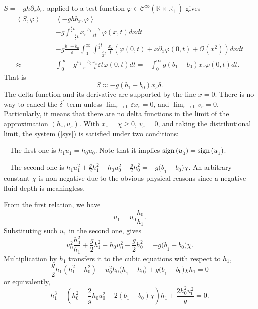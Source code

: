\documentclass{article}
\theoremstyle{plain}
\theoremstyle{definition}
\theoremstyle{remark}
\begin{document}
$S=-gh\partial_{x}b_{\varepsilon}$, applied to a test function 
$\varphi\in \mathcal{C}^{\infty}(\mathbb{R}\times \mathbb{R}_{+})$ gives
\[ 
\begin{split} \left\langle S,\varphi \right\rangle = & \left\langle - ghb_{x},
\varphi \right\rangle  \\ 
= & - g \int_{-\frac{\varepsilon}{2}t}^{\frac{\varepsilon}{2}t}
{x_{\varepsilon}\frac{b_{1} - b_{0}}{\varepsilon t}}\varphi(x,t)dxdt  \\ 
= & - g\frac{b_{1} - b_{0}}{\varepsilon}
\int_{0}^{\infty} \int_{- \frac{\varepsilon}{2}t}^{\frac{\varepsilon}{2}t}
\frac{x_{\varepsilon}}{t} 
\left( \varphi(0,t) + x\partial_{x}\varphi(0,t) 
+ \mathcal{O}\left( x^{2} \right) \right)dx dt  \\ 
\approx & \int_{0}^{\infty}{- g\frac{b_{1} - b_{0}}{\varepsilon}
\frac{x_{\varepsilon}}{t}}\varepsilon t\varphi(0,t)dt
= - \int_{0}^{\infty}g(b_{1} - b_{0})x_{\varepsilon}\varphi(0,t)dt. 
\end{split} \]
That is
\[S \approx - g\left( b_{1} - b_{0} \right)x_{\varepsilon}\delta.\]
The delta function and its 
derivative are supported by the line \(x = 0\).
There is no way to cancel  the \(\delta^{'}\) term 
unless \( \lim_{\varepsilon \to 0} \varepsilon {x_{\varepsilon} 
= 0}\), and  
\( \lim_{\varepsilon \to 0} v_{\varepsilon} = 0.\)
Particularly, it means that there are no delta functions in the
limit of the approximation $(h_{\varepsilon},u_{\varepsilon})$. 
With \(x_{\varepsilon} = \chi \geq 0\), $v_{\varepsilon}=0$,
and taking the distributional limit, the system (\ref{sys}) 
is satisfied under two conditions:

\noindent
-- The first one is \(h_{1}u_{1} = h_{0}u_{0}\). Note that it implies 
\( \mathop{\rm sign}{(u}_{0}) 
= \mathop{\rm sign}{(u}_{1})\).

\noindent
-- The second one is 
\(h_{1}u_{1}^{2} + \frac{g}{2}h_{1}^{2} - h_{0}u_{0}^{2} - \frac{g}{2}h_{0}^{2} 
= - g{(b}_{1} - b_{0})\chi.\)
An arbitrary constant \(\chi \) is non-negative due 
to the obvious physical reasons since a negative fluid depth is meaningless.

From the first relation, we have
\begin{equation} \label{u1}
u_{1} = u_{0}\dfrac{h_{0}}{h_{1}}.
\end{equation}
Substituting such \(u_{1}\) in the second one, gives
\[u_{0}^{2}\frac{h_{0}^{2}}{h_{1}} + \frac{g}{2}h_{1}^{2} - h_{0}u_{0}^{2} - \frac{g}{2}h_{0}^{2} = - g{(b}_{1} - b_{0})\chi. \]
Multiplication by \(h_{1}\) transfers it to the cubic equations
with respect to $h_{1}$, 
\[\frac{g}{2}h_{1}\left( h_{1}^{2} - h_{0}^{2} \right) 
- u_{0}^{2}{h_{0}(h}_{1} - h_{0}) + g{(b}_{1} - b_{0})\chi h_{1} = 0\]
or equivalently, 
\begin{equation} \label{h1}
h_{1}^{3} - \left( h_{0}^{2} + \frac{2}{g}h_{0}u_{0}^{2} - 2(b_{1}-b_{0}) 
\chi  \right) h_{1} + \frac{2 h_{0}^{2}u_{0}^{2}}{g}  = 0.
\end{equation}
\end{document}
